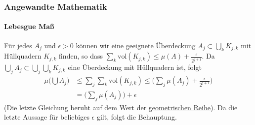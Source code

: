 \documentclass{beamer}
\begin{document}
\begin{frame}
    \frametitle{Angewandte Mathematik}
\framesubtitle{Lebesgue Maß}
    \begin{block}{}
Für jedes $A_j$ und $\epsilon > 0$ können wir  eine geeignete Überdeckung  $A_j \subset \bigcup_k  K_{j,k}$ mit Hüllquadern $K_{j,k}$ finden, so dass 
 $\sum_k \text{vol} (K_{j,k}) \leq \mu(A) + \frac{\epsilon}{2^{j+1}}$.
Da $ \bigcup_j A_j \subset \bigcup_j \bigcup_k  K_{j,k}$ eine Überdeckung mit Hüllquadern ist, folgt
\begin{align*}
\mu \biggl (  \bigcup A_j  \biggr) & \leq \sum_j \sum_k \text{vol} (K_{j,k}) \leq  \bigl( \sum_j  \mu(A_j) + \frac{\epsilon}{2^{j+1}} \bigr)  \\
&= \bigl (\sum_j \mu(A_j) \bigr ) + \epsilon
\end{align*}
(Die letzte Gleichung beruht auf dem Wert der \href{https://de.wikipedia.org/wiki/Geometrische_Reihe}{geometrischen Reihe}).
Da die letzte Aussage für beliebiges $\epsilon$ gilt, folgt die Behauptung.
\end{block}
 \end{frame}
\end{document}
